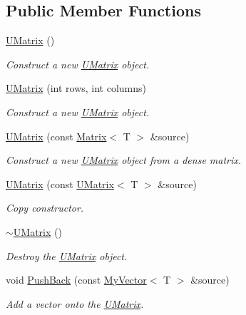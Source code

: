 \subsection*{Public Member Functions}
\begin{DoxyCompactItemize}
\item 
\mbox{\hyperlink{class_u_matrix_a7c6cfdd2d26c56bca1f5b1d79e7f2ee2}{U\+Matrix}} ()
\begin{DoxyCompactList}\small\item\em Construct a new \mbox{\hyperlink{class_u_matrix}{U\+Matrix}} object. \end{DoxyCompactList}\item 
\mbox{\hyperlink{class_u_matrix_ad0d2d3e05ad904daed36504eddd25a2c}{U\+Matrix}} (int rows, int columns)
\begin{DoxyCompactList}\small\item\em Construct a new \mbox{\hyperlink{class_u_matrix}{U\+Matrix}} object. \end{DoxyCompactList}\item 
\mbox{\hyperlink{class_u_matrix_a784cebb7d674ada97720bcb34f49ca6b}{U\+Matrix}} (const \mbox{\hyperlink{class_matrix}{Matrix}}$<$ T $>$ \&source)
\begin{DoxyCompactList}\small\item\em Construct a new \mbox{\hyperlink{class_u_matrix}{U\+Matrix}} object from a dense matrix. \end{DoxyCompactList}\item 
\mbox{\hyperlink{class_u_matrix_ab95abe504ff32df243d625b6b749077d}{U\+Matrix}} (const \mbox{\hyperlink{class_u_matrix}{U\+Matrix}}$<$ T $>$ \&source)
\begin{DoxyCompactList}\small\item\em Copy constructor. \end{DoxyCompactList}\item 
\mbox{\hyperlink{class_u_matrix_ada29056d4baec18fcb9bc47dc49e8d53}{$\sim$\+U\+Matrix}} ()
\begin{DoxyCompactList}\small\item\em Destroy the \mbox{\hyperlink{class_u_matrix}{U\+Matrix}} object. \end{DoxyCompactList}\item 
void \mbox{\hyperlink{class_u_matrix_a57003b0a0f3fe394ab04f9588732a928}{Push\+Back}} (const \mbox{\hyperlink{class_my_vector}{My\+Vector}}$<$ T $>$ \&source)
\begin{DoxyCompactList}\small\item\em Add a vector onto the \mbox{\hyperlink{class_u_matrix}{U\+Matrix}}. \end{DoxyCompactList}\item 

\end{DoxyCompactItemize}
